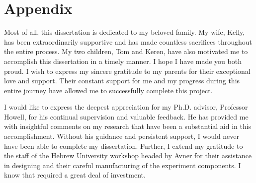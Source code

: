 \documentclass[\main/master.tex]{subfiles}
\begin{document}
\newspacing
\chapter{Appendix}\label{chapter:Appendix}
Most of all, this dissertation is dedicated to my beloved family. My wife, Kelly,
has been extraordinarily supportive and has made countless sacrifices throughout the entire
process. My two children, Tom and Keren, have also motivated me to accomplish this
dissertation in a timely manner. I hope I have made you both proud. I wish to express my
sincere gratitude to my parents for their exceptional love and support. Their constant support for me and my progress during this entire journey have allowed me
to successfully complete this project. 
\par\noindent
I would like to express the deepest appreciation for my Ph.D. advisor, Professor Howell, for his continual supervision and valuable feedback. He
has provided me with insightful comments on my research that have been a substantial aid
in this accomplishment. Without his guidance and persistent support, I would never have
been able to complete my dissertation. Further, I extend my gratitude to the staff of the Hebrew University workshop headed by Avner for their assistance in designing and their careful manufacturing of the experiment components. I know that required a great deal of investment.
\end{document}
